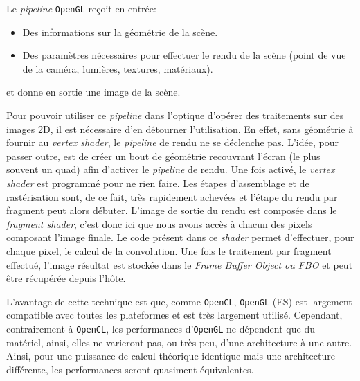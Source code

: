 
Le \emph{pipeline} \texttt{OpenGL} reçoit en entrée:
\begin{itemize}
\item Des informations sur la géométrie de la scène.
\item Des paramètres nécessaires pour effectuer le rendu de la scène (point de vue de la caméra, lumières, textures, matériaux).
\end{itemize}
et donne en sortie une image de la scène.

Pour pouvoir utiliser ce \emph{pipeline} dans l'optique d'opérer des traitements sur des images 2D, il est nécessaire d'en détourner l'utilisation. En effet, sans géométrie à fournir au \emph{vertex shader}, le \emph{pipeline} de rendu ne se déclenche pas. L'idée, pour passer outre, est de créer un bout de géométrie recouvrant l'écran (le plus souvent un quad) afin d'activer le \emph{pipeline} de rendu. Une fois activé, le \emph{vertex shader} est programmé pour ne rien faire. Les étapes d'assemblage et de rastérisation sont, de ce fait, très rapidement achevées et l'étape du rendu par fragment peut alors débuter. L'image de sortie du rendu est composée dans le \emph{fragment shader}, c'est donc ici que nous avons accès à chacun des pixels composant l'image finale. Le code présent dans ce \emph{shader} permet d'effectuer, pour chaque pixel, le calcul de la convolution. Une fois le traitement par fragment effectué, l'image résultat est stockée dans le \emph{Frame Buffer Object ou FBO} et peut être récupérée depuis l'hôte.

L'avantage de cette technique est que, comme \texttt{OpenCL}, \texttt{OpenGL} (ES) est largement compatible avec toutes les plateformes et est très largement utilisé. Cependant, contrairement à \texttt{OpenCL}, les performances d'\texttt{OpenGL} ne dépendent que du matériel, ainsi, elles ne varieront pas, ou très peu, d'une architecture à une autre. Ainsi, pour une puissance de calcul théorique identique mais une architecture différente, les performances seront quasiment équivalentes.

